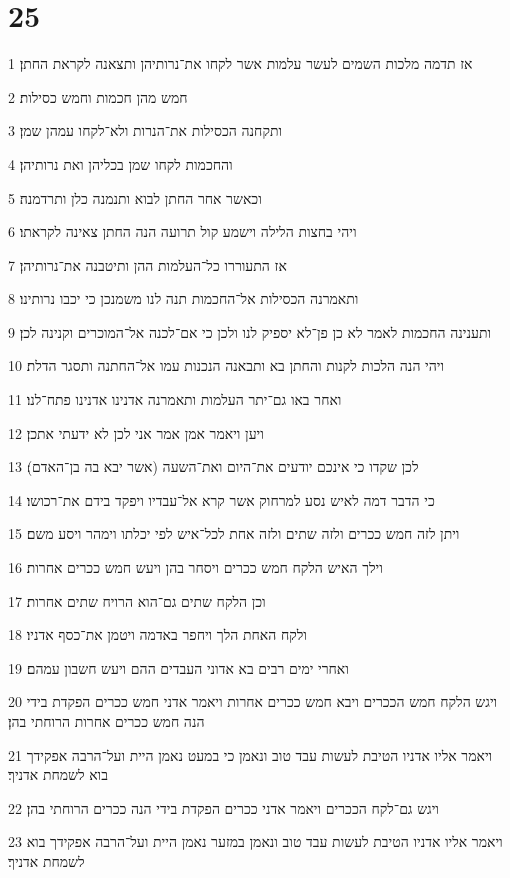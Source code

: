 \chapter{25}

\par 1 אז תדמה מלכות השמים לעשר עלמות אשר לקחו את־נרותיהן ותצאנה לקראת החתן׃
\par 2 חמש מהן חכמות וחמש כסילות׃
\par 3 ותקחנה הכסילות את־הנרות ולא־לקחו עמהן שמן׃
\par 4 והחכמות לקחו שמן בכליהן ואת נרותיהן׃
\par 5 וכאשר אחר החתן לבוא ותנמנה כלן ותרדמנה׃
\par 6 ויהי בחצות הלילה וישמע קול תרועה הנה החתן צאינה לקראתו׃
\par 7 אז התעוררו כל־העלמות ההן ותיטבנה את־נרותיהן׃
\par 8 ותאמרנה הכסילות אל־החכמות תנה לנו משמנכן כי יכבו נרותינו׃
\par 9 ותענינה החכמות לאמר לא כן פן־לא יספיק לנו ולכן כי אם־לכנה אל־המוכרים וקנינה לכן׃
\par 10 ויהי הנה הלכות לקנות והחתן בא ותבאנה הנכנות עמו אל־החתנה ותסגר הדלת׃
\par 11 ואחר באו גם־יתר העלמות ותאמרנה אדנינו אדנינו פתח־לנו׃
\par 12 ויען ויאמר אמן אמר אני לכן לא ידעתי אתכן׃
\par 13 לכן שקדו כי אינכם יודעים את־היום ואת־השעה (אשר יבא בה בן־האדם)׃
\par 14 כי הדבר דמה לאיש נסע למרחוק אשר קרא אל־עבדיו ויפקד בידם את־רכושו׃
\par 15 ויתן לזה חמש ככרים ולזה שתים ולזה אחת לכל־איש לפי יכלתו וימהר ויסע משם׃
\par 16 וילך האיש הלקח חמש ככרים ויסחר בהן ויעש חמש ככרים אחרות׃
\par 17 וכן הלקח שתים גם־הוא הרויח שתים אחרות׃
\par 18 ולקח האחת הלך ויחפר באדמה ויטמן את־כסף אדניו׃
\par 19 ואחרי ימים רבים בא אדוני העבדים ההם ויעש חשבון עמהם׃
\par 20 ויגש הלקח חמש הככרים ויבא חמש ככרים אחרות ויאמר אדני חמש ככרים הפקדת בידי הנה חמש ככרים אחרות הרוחתי בהן׃
\par 21 ויאמר אליו אדניו הטיבת לעשות עבד טוב ונאמן כי במעט נאמן היית ועל־הרבה אפקידך בוא לשמחת אדניך׃
\par 22 ויגש גם־לקח הככרים ויאמר אדני ככרים הפקדת בידי הנה ככרים הרוחתי בהן׃
\par 23 ויאמר אליו אדניו הטיבת לעשות עבד טוב ונאמן במזער נאמן היית ועל־הרבה אפקידך בוא לשמחת אדניך׃
